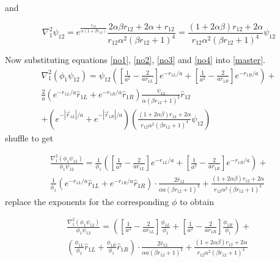 \documentclass{article}
\begin{document}
and 

\begin{equation}
\label{no4}
 \nabla_1^2 \psi_{12}=e^{\frac{r_{12} }{\alpha(1+\beta r_{12} ) }} \frac{2\alpha \beta r_{12} + 2\alpha+r_{12}}{r_{12}\alpha^2(\beta r_{12}+1)^4} =  \frac{(1+2\alpha \beta) r_{12} + 2\alpha}{r_{12}\alpha^2(\beta r_{12}+1)^4} \psi_{12}
\end{equation}

Now substituting equations \ref{no1}, \ref{no2}, \ref{no3} and \ref{no4} into \ref{master}.
\begin{multline}
 \nabla_1^2(\phi_1\psi_{12}) =\psi_{12} \left( \left[\frac{1}{a^2}-\frac{2}{a{r}_{1L}} \right] e^{-{r}_{1L}/a} + \left[\frac{1}{a^2}-\frac{2}{a{r}_{1R}} \right] e^{-{r}_{1R}/a}  \right) +\\ \frac2a \left(  e^{-{r}_{1L}/a}\hat{r}_{1L} +e^{-{r}_{1R}/a}\hat{r}_{1R} \right)\frac{\psi_{12}}{\alpha (\beta r_{12}+1)^2}\hat{r}_{12} \\ +\left( e^{-|\vec{r}_{1L}|/a} + e^{-|\vec{r}_{1R}|/a} \right) \left(   \frac{(1+2\alpha \beta) r_{12} + 2\alpha}{r_{12}\alpha^2(\beta r_{12}+1)^4} \psi_{12} \right)
\end{multline}
shuffle to get

\begin{multline}
 \frac{\nabla_1^2(\phi_1\psi_{12})}{\phi_1 \psi_{12}} =\frac{1}{\phi_1} \left( \left[\frac{1}{a^2}-\frac{2}{ar_{1L}} \right] e^{-r_{1L}/a} + \left[\frac{1}{a^2} - \frac{2}{ar_{1R}} \right] e^{-{r}_{1R}/a}  \right)   
+ \\ \frac{1}{\phi_1 } \left(  e^{-{r}_{1L}/a}\hat{r}_{1L} +e^{-{r}_{1R}/a}\hat{r}_{1R} \right) \cdot \frac{2\hat{r}_{12}}{\alpha a(\beta r_{12}+1)^2}+    \frac{(1+2\alpha \beta) r_{12} 
+ 2\alpha}{r_{12}\alpha^2(\beta r_{12}+1)^4} 
\end{multline}
replace the exponents for the corresponding $\phi$ to obtain

\begin{multline}
\frac{\nabla_1^2(\phi_1\psi_{12})}{\phi_1 \psi_{12}} 
 = \left( \left[\frac{1}{a^2}-\frac{2}{ar_{1L}} \right] \frac{\phi_{1L}}{\phi_1} + \left[\frac{1}{a^2} - \frac{2}{ar_{1R}} \right] \frac{\phi_{1R}}{\phi_1}   \right)   
 + \\ \left(  \frac{\phi_{1L}}{\phi_1}\hat{r}_{1L} +\frac{\phi_{1R}}{\phi_1}\hat{r}_{1R} \right) \cdot \frac{2\hat{r}_{12}}{\alpha a(\beta r_{12}+1)^2}+    \frac{(1+2\alpha \beta) r_{12} 
 + 2\alpha}{r_{12}\alpha^2(\beta r_{12}+1)^4} 
\end{multline}
\end{document}

